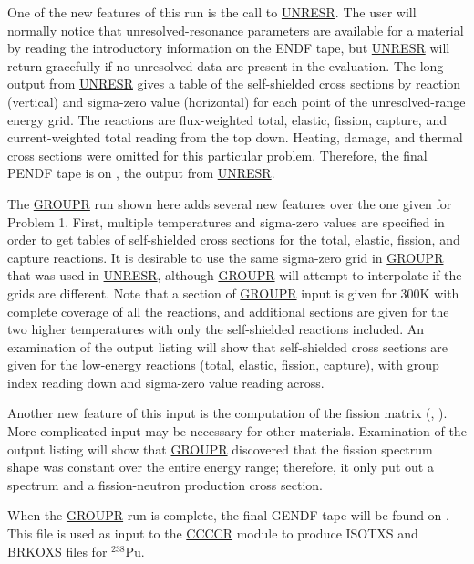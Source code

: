 One of the new features of this run is the call to
\hyperlink{sUNRESRhy}{UNRESR}.  The
user will normally notice that unresolved-resonance parameters
are available for a material by reading the introductory
information on the ENDF tape, but
\hyperlink{sUNRESRhy}{UNRESR} will return gracefully
if no unresolved data are present in the evaluation.  The long output
from \hyperlink{sUNRESRhy}{UNRESR} gives a table
of the self-shielded
cross sections by reaction (vertical) and  sigma-zero
value (horizontal) for each point of the unresolved-range energy grid.
The reactions are flux-weighted total, elastic, fission, capture, and
current-weighted total reading from the top down.  Heating, damage,
and thermal cross sections were omitted for this particular problem.
Therefore, the final PENDF tape is on , the output
from \hyperlink{sUNRESRhy}{UNRESR}.

The \hyperlink{sGROUPRhy}{GROUPR} run
shown here adds several new features over
the one given for Problem 1.  First, multiple temperatures and sigma-zero
values are specified in order to get tables of self-shielded
cross sections for the total, elastic, fission, and capture reactions.
It is desirable to use the same sigma-zero grid in
\hyperlink{sGROUPRhy}{GROUPR} that was used
in \hyperlink{sUNRESRhy}{UNRESR}, although
\hyperlink{sGROUPRhy}{GROUPR} will attempt to interpolate if the
grids are different.  Note that a section of
\hyperlink{sGROUPRhy}{GROUPR} input is given for 300K with
complete coverage of all the reactions, and additional sections are
given for the two higher temperatures with only the self-shielded
reactions included.  An examination of the output
listing will show that self-shielded cross sections are given for the
low-energy reactions (total, elastic, fission, capture), with group
index reading down and sigma-zero value reading across.

Another new feature of this input is the computation of the
fission matrix (, ).  More complicated
input may be necessary for other materials.  Examination of the
output listing will show that \hyperlink{sGROUPRhy}{GROUPR}
discovered that the fission spectrum shape was constant over
the entire energy range; therefore, it only put out a spectrum
and a fission-neutron production cross section.

When the \hyperlink{sGROUPRhy}{GROUPR} run is complete,
the final GENDF tape will be found on .  This file is
used as input to the \hyperlink{sCCCCRhy}{CCCCR}
module to produce ISOTXS and BRKOXS files for $^{238}$Pu.


